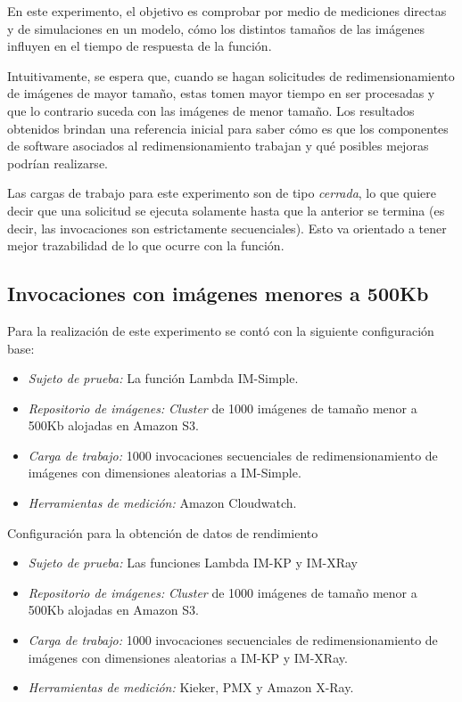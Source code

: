 En este experimento, el objetivo es comprobar por medio de mediciones directas y de simulaciones en un modelo, cómo los distintos tamaños de las imágenes influyen en el tiempo de respuesta de la función.

Intuitivamente, se espera que, cuando se hagan solicitudes de redimensionamiento de imágenes de mayor tamaño, estas tomen mayor tiempo en ser procesadas y que lo contrario suceda con las imágenes de menor tamaño. Los resultados obtenidos brindan una referencia inicial para saber cómo es que los componentes de software asociados al redimensionamiento trabajan y qué posibles mejoras podrían realizarse.

Las cargas de trabajo para este experimento son de tipo \emph{cerrada}, lo que quiere decir que una solicitud se ejecuta solamente hasta que la anterior se termina (es decir, las invocaciones son estrictamente secuenciales). Esto va orientado a tener mejor trazabilidad de lo que ocurre con la función.



\subsection{Invocaciones con imágenes menores a 500Kb}
Para la realización de este experimento se contó con la siguiente configuración base:
\begin{itemize}
    \item \emph{Sujeto de prueba:} La función Lambda IM-Simple.
    \item \emph{Repositorio de imágenes:} \emph{Cluster} de 1000 imágenes de tamaño menor a 500Kb alojadas en Amazon S3.     
    \item \emph{Carga de trabajo:} 1000 invocaciones secuenciales de redimensionamiento de imágenes con dimensiones aleatorias a IM-Simple.
    \item \emph{Herramientas de medición:} Amazon Cloudwatch.
\end{itemize}

Configuración para la obtención de datos de rendimiento

\begin{itemize}
    \item \emph{Sujeto de prueba:} Las funciones Lambda IM-KP y IM-XRay
    \item \emph{Repositorio de imágenes:} \emph{Cluster} de 1000 imágenes de tamaño menor a 500Kb alojadas en Amazon S3.     
    \item \emph{Carga de trabajo:} 1000 invocaciones secuenciales de redimensionamiento de imágenes con dimensiones aleatorias a IM-KP y IM-XRay.
    \item \emph{Herramientas de medición:} Kieker, PMX y Amazon X-Ray.
\end{itemize}

